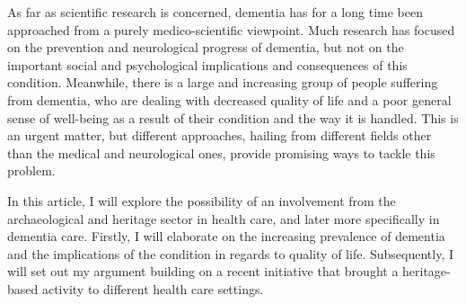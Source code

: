 As far as scientific research is concerned, dementia has for a long time been approached 
from a purely medico-scientific viewpoint. Much research has focused on the prevention and
neurological progress of dementia, but not on the important social and psychological
implications and consequences of this condition. Meanwhile, there is a large and increasing
group of people suffering from dementia, who are dealing with decreased quality of life and 
a poor general sense of well-being as a result of their condition and the way it is handled.
This is an urgent matter, but different approaches, hailing from different fields other than
the medical and neurological ones, provide promising ways to tackle this problem.

In this article, I will explore the possibility of an involvement from the archaeological 
and heritage sector in health care, and later more specifically in dementia care. 
Firstly, I will elaborate on the increasing prevalence of dementia and the implications of 
the condition in regards to quality of life. Subsequently, I will set out my argument 
building on a recent initiative that brought a heritage-based activity to different 
health care settings.
		
	
